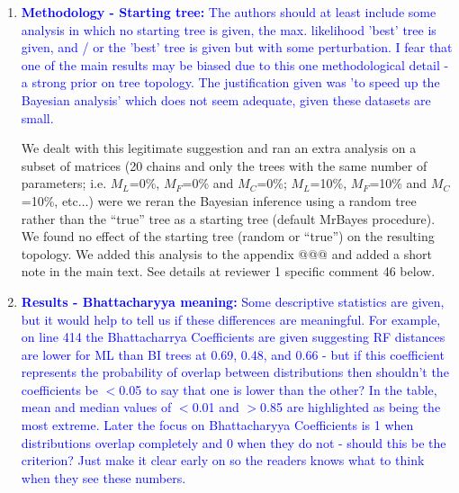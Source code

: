 \documentclass[12pt,letterpaper]{article}
\begin{document}
\begin{enumerate}
\item{\textcolor{blue}{\textbf{Methodology - Starting tree:} The authors should at least include some analysis in which no starting tree is given, the max. likelihood 'best' tree is given, and / or the 'best' tree is given but with some perturbation.
I fear that one of the main results may be biased due to this one methodological detail - a strong prior on tree topology.
The justification given was 'to speed up the Bayesian analysis' which does not seem adequate, given these datasets are small.}}

We dealt with this legitimate suggestion and ran an extra analysis on a subset of matrices (20 chains and only the trees with the same number of parameters; i.e. $M_L$=0\%, $M_F$=0\% and $M_C$=0\%; $M_L$=10\%, $M_F$=10\% and $M_C$=10\%, etc...) were we reran the Bayesian inference using a random tree rather than the ``true'' tree as a starting tree (default MrBayes procedure).
We found no effect of the starting tree (random or ``true'') on the resulting topology.
We added this analysis to the appendix @@@ and added a short note in the main text.
See details at reviewer 1 specific comment 46 below.

\item{\textcolor{blue}{\textbf{Results - Bhattacharyya meaning:} Some descriptive statistics are given, but it would help to tell us if these differences are meaningful.
For example, on line 414 the Bhattacharrya Coefficients are given suggesting RF distances are lower for ML than BI trees at 0.69, 0.48, and 0.66 - but if this coefficient represents the probability of overlap between distributions then shouldn't the coefficients be $<$0.05 to say that one is lower than the other?
In the table, mean and median values of $<$0.01 and $>$0.85 are highlighted as being the most extreme.
Later the focus on Bhattacharyya Coefficients is 1 when distributions overlap completely and 0 when they do not - should this be the criterion?
Just make it clear early on so the readers knows what to think when they see these numbers. }}


\end{enumerate}
\end{document}
